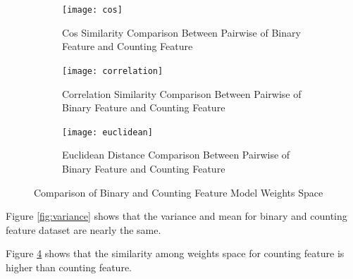 \documentclass{sig-alternate}
\begin{document}



\begin{figure}
    \centering
    \begin{subfigure}[b]{0.3\textwidth}
        \centering
        \texttt{[image: cos]}
        \caption{Cos Similarity Comparison Between Pairwise of Binary Feature and Counting Feature}
        \label{fig:cos}
    \end{subfigure}
    \hfill
    \begin{subfigure}[b]{0.3\textwidth}
        \centering
        \texttt{[image: correlation]}
        \caption{Correlation Similarity Comparison Between Pairwise of Binary Feature and Counting Feature}
        \label{fig:correlation}
    \end{subfigure}
    \hfill
    \begin{subfigure}[b]{0.3\textwidth}
        \centering
        \texttt{[image: euclidean]}
        \caption{Euclidean Distance Comparison Between Pairwise of Binary Feature and Counting Feature}
        \label{fig:euclidean}
    \end{subfigure}
    \caption{Comparison of Binary and Counting Feature Model Weights Space}
    \label{fig:three graphs}
\end{figure}


Figure \ref{fig:variance} shows that the variance and mean for binary and counting feature dataset are nearly the same. 

Figure \ref{fig:three graphs} shows that the similarity among weights space for counting feature is higher than counting feature. 
\end{document}
